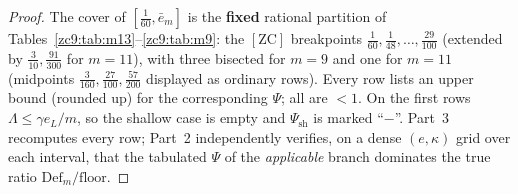 \documentclass[11pt]{amsart}
\newcommand{\Def}{\mathrm{Def}}
\newcommand{\ZC}{[\textrm{ZC}]}
\begin{document}
\begin{proof}
The cover of $[\tfrac1{60},\bar e_m]$ is the \textbf{fixed} rational partition of
Tables~\ref{zc9:tab:m13}--\ref{zc9:tab:m9}: the $\ZC$ breakpoints
$\tfrac1{60},\tfrac1{48},\dots,\tfrac{29}{100}$ (extended by
$\tfrac3{10},\tfrac{91}{300}$ for $m=11$), with three bisected for $m=9$ and one
for $m=11$ (midpoints $\tfrac3{160},\tfrac{27}{100},\tfrac{57}{200}$ displayed as
ordinary rows).  Every row lists an upper bound (rounded up) for the
corresponding $\Psi$; all are $<1$.  On the first rows $\Lambda\le\gamma e_L/m$,
so the shallow case is empty and $\Psi_{\mathrm{sh}}$ is marked ``$-$''.
Part~3 recomputes every row; Part~2 independently verifies, on a dense
$(e,\kappa)$ grid over each interval, that the tabulated $\Psi$ of the
\emph{applicable} branch dominates the true ratio $\Def_m/\text{floor}$.
\end{proof}
\end{document}
